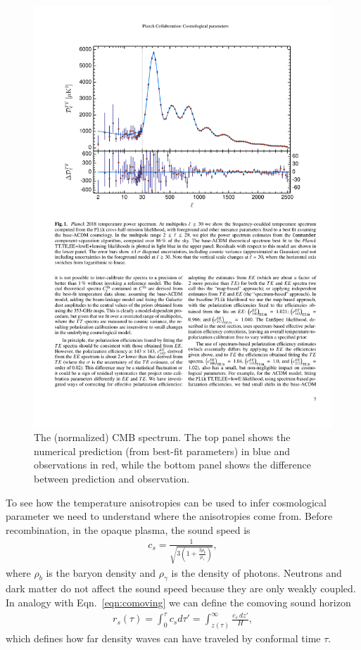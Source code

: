 \documentclass[12pt]{article}
\renewcommand{\th}[1]{\frac{1}{#1}}
\begin{document}
\begin{figure}
\centering
\includegraphics[width=.8\textwidth]{spectrum}
\caption{The (normalized) CMB spectrum. The top panel shows the numerical prediction (from best-fit parameters) in blue and observations in red, while the bottom panel shows the difference between prediction and observation.}
\label{fig:spectrum}
\end{figure}

To see how the temperature anisotropies can be used to infer cosmological parameter we need to understand where the anisotropies come from. Before recombination, in the opaque plasma, the sound speed is 
\begin{align}
c_s = \th{\sqrt{3(1+\frac{3\rho_b}{\rho_\gamma})}},
\end{align}
where $\rho_b$ is the baryon density and $\rho_\gamma$ is the density of photons. Neutrons and dark matter do not affect the sound speed because they are only weakly coupled. In analogy with Eqn.~\ref{eqn:comoving} we can define the comoving sound horizon~\cite{Planck2013}
\begin{align}
r_s(\tau) = \int_0^\tau c_s d\tau' = \int_{z(\tau) }^\infty \frac{c_s\, dz'}{H}, \label{eqn:rs}
\end{align}
which defines how far density waves can have traveled by conformal time $\tau$. 
\end{document}
